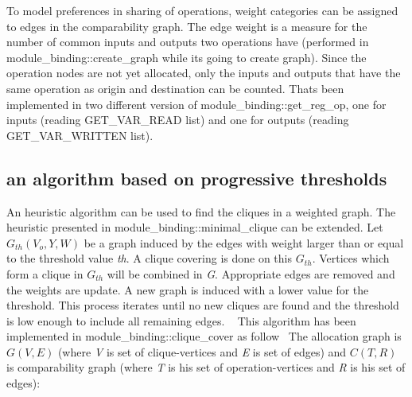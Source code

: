  To model preferences in sharing of operations, weight categories can be assigned to edges in the comparability graph. The edge weight is a measure for the number of common inputs and outputs two operations have (performed in module\+\_\+binding\+::create\+\_\+graph while it\textquotesingle{}s going to create graph). Since the operation nodes are not yet allocated, only the inputs and outputs that have the same operation as origin and destination can be counted. That\textquotesingle{}s been implemented in two different version of module\+\_\+binding\+::get\+\_\+reg\+\_\+op, one for inputs (reading G\+E\+T\+\_\+\+V\+A\+R\+\_\+\+R\+E\+AD list) and one for outputs (reading G\+E\+T\+\_\+\+V\+A\+R\+\_\+\+W\+R\+I\+T\+T\+EN list).\hypertarget{src_HLS_module_binding_page_threshold}{}\subsection{an algorithm based on progressive thresholds}\label{src_HLS_module_binding_page_threshold}
An heuristic algorithm can be used to find the cliques in a weighted graph. The heuristic presented in module\+\_\+binding\+::minimal\+\_\+clique can be extended. Let $ G_{th}(V_{o},Y,W) $ be a graph induced by the edges with weight larger than or equal to the threshold value {\itshape th}. A clique covering is done on this $ G_{th} $. Vertices which form a clique in $ G_{th} $ will be combined in {\itshape G}. Appropriate edges are removed and the weights are update. A new graph is induced with a lower value for the threshold. This process iterates until no new cliques are found and the threshold is low enough to include all remaining edges. ~\newline
 This algorithm has been implemented in module\+\_\+binding\+::clique\+\_\+cover as follow~\newline
 The allocation graph is $ G(V,E)$ (where {\itshape V} is set of clique-\/vertices and {\itshape E} is set of edges) and $ C(T,R)$ is comparability graph (where {\itshape T} is his set of operation-\/vertices and {\itshape R} is his set of edges)\+:~\newline
~\newline
